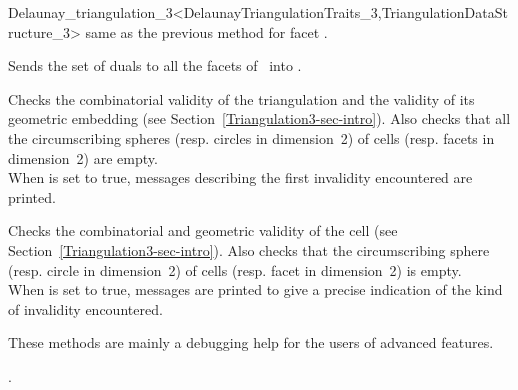 \begin{ccRefClass}{Delaunay_triangulation_3<DelaunayTriangulationTraits_3,TriangulationDataStructure_3>}
{same as the previous method for facet .}

{Sends the set of duals to all the facets of \ccVar\ into .}


\begin{ccAdvanced}
{Checks the combinatorial validity of the triangulation and the
validity of its geometric embedding (see
Section~\ref{Triangulation3-sec-intro}). Also checks that all the
circumscribing spheres (resp. circles in dimension~2) of  cells
(resp. facets in dimension~2) are empty.\\ When  is set to
true,  messages describing the first invalidity encountered are
printed.}

{Checks the combinatorial and geometric validity of the cell (see
Section~\ref{Triangulation3-sec-intro}). Also checks that the
circumscribing sphere (resp. circle in dimension~2) of  cells
(resp. facet in dimension~2) is empty.\\
 When  is set to
true, messages are printed to give
a precise indication of the kind of invalidity encountered.}

These methods are  mainly a debugging help for the users of advanced features.
\end{ccAdvanced}

\ccSeeAlso

.



\end{ccRefClass}
